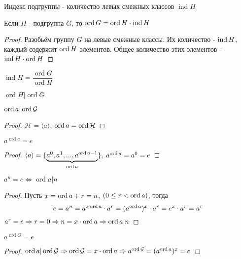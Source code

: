 \documentclass[../main/document.tex]{subfiles}
\begin{document}
\begin{dfn}
Индекс подгруппы - количество левых смежных классов $\operatorname{ind}H$
\end{dfn}

\begin{thm}
Если $H$ - подгруппа $G$, то $\operatorname{ord}G=\operatorname{ord}H\cdot \operatorname{ind} H$
\begin{proof}
Разобьём группу $G$ на левые смежные классы. Их количество - $\operatorname{ind} H$, каждый содержит $\operatorname{ord} H$ элементов. Общее количество этих элементов - $\operatorname{ind} H\cdot \operatorname{ord} H$

\end{proof}
\end{thm}
\begin{cnsq}
$\operatorname{ind}H=\dfrac{\operatorname{ord}G}{\operatorname{ord}H}$
\end{cnsq}

\begin{cnsq}
$\operatorname{ord}H|\operatorname{ord}G$
\end{cnsq}

\begin{cnsq}
$\operatorname{ord} a| \operatorname{ord} \mathcal{G}$
\begin{proof}
$\mathcal{H}=\langle a\rangle$, $\operatorname{ord} a= \operatorname{ord} \mathcal{H}$

\end{proof}
\end{cnsq}

\begin{thm}
$a^{\operatorname{ord}a}=e$
\begin{proof}
$\langle a\rangle=\{\underbrace{a^0,a^1,...,a^{\operatorname{ord} a-1}}_{\operatorname{ord} a}\}$, $a^{\operatorname{ord} a}=a^0=e$

\end{proof}
\end{thm}


\begin{thm}
$a^{n}=e\Leftrightarrow \operatorname{ord}a|n$
\begin{proof}
Пусть $x=\operatorname{ord} a +r=n$, $(0\leq r< \operatorname{ord} a)$, тогда
$$e=a^n=a^{x\operatorname{ord} a}\cdot a^r=(a^{\operatorname{ord} a})^x\cdot a^r=e^x\cdot a^r=a^r$$
$a^r=e\Rightarrow r=0 \Rightarrow n=x\cdot \operatorname{ord} a\Rightarrow \operatorname{ord} a|n$

\end{proof}
\end{thm}

\begin{thm}
$a^{\operatorname{ord}G}=e$
\begin{proof}
$\operatorname{ord} a| \operatorname{ord} \mathcal{G}\Rightarrow \operatorname{ord} \mathcal{G}=x\cdot\operatorname{ord} a\Rightarrow a^{\operatorname{ord} \mathcal{G}}=(a^{\operatorname{ord} a})^x=e$

\end{proof}
\end{thm}
\end{document}
